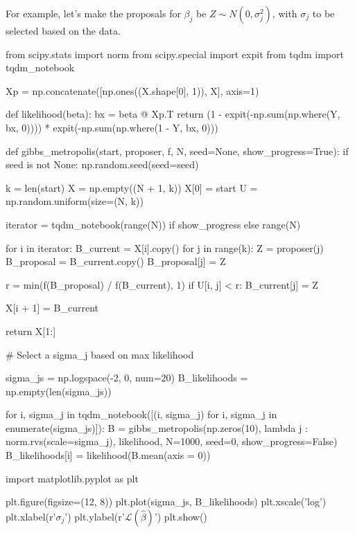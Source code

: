 For example, let's make the proposals for \(\beta_j\) be
\(Z \sim N(0, \sigma_j^2)\), with \(\sigma_j\) to be selected based on
the data.

\begin{python}
from scipy.stats import norm
from scipy.special import expit
from tqdm import tqdm_notebook

Xp = np.concatenate([np.ones((X.shape[0], 1)), X], axis=1)

def likelihood(beta):
    bx = beta @ Xp.T
    return (1 - expit(-np.sum(np.where(Y, bx, 0)))) * expit(-np.sum(np.where(1 - Y, bx, 0)))

def gibbs_metropolis(start, proposer, f, N, seed=None, show_progress=True):
    if seed is not None:
        np.random.seed(seed=seed)
    
    k = len(start)
    X = np.empty((N + 1, k))
    X[0] = start
    U = np.random.uniform(size=(N, k))
    
    iterator = tqdm_notebook(range(N)) if show_progress else range(N)
    
    for i in iterator:
        B_current = X[i].copy()
        for j in range(k):
            Z = proposer(j)
            B_proposal = B_current.copy()
            B_proposal[j] = Z
            
            r = min(f(B_proposal) / f(B_current), 1)
            if U[i, j] < r:
                B_current[j] = Z
                
        X[i + 1] = B_current
    
    return X[1:]
\end{python}

\begin{python}
# Select a sigma_j based on max likelihood

sigma_js = np.logspace(-2, 0, num=20)
B_likelihoods = np.empty(len(sigma_js))

for i, sigma_j in tqdm_notebook([(i, sigma_j) for i, sigma_j in enumerate(sigma_js)]):
    B = gibbs_metropolis(np.zeros(10), lambda j : norm.rvs(scale=sigma_j), likelihood, N=1000, seed=0, show_progress=False)
    B_likelihoods[i] = likelihood(B.mean(axis = 0))
\end{python}

\begin{python}
import matplotlib.pyplot as plt

plt.figure(figsize=(12, 8))
plt.plot(sigma_js, B_likelihoods)
plt.xscale('log')
plt.xlabel(r'$\sigma_j$')
plt.ylabel(r'$\mathcal{L}(\hat{\beta})$')
plt.show()
\end{python}

